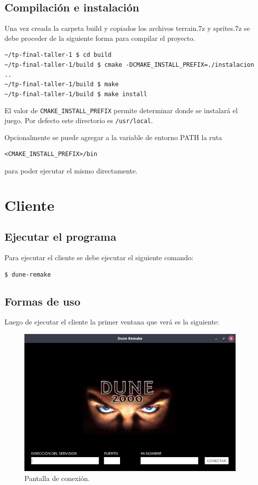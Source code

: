 \documentclass[titlepage,a4paper,12pt]{article}
\begin{document}
\subsection{Compilación e instalación}
Una vez creada la carpeta build y copiados los archivos terrain.7z y sprites.7z se debe proceder de la siguiente forma para compilar el proyecto.

\begin{verbatim}
~/tp-final-taller-1 $ cd build
~/tp-final-taller-1/build $ cmake -DCMAKE_INSTALL_PREFIX=./instalacion ..
~/tp-final-taller-1/build $ make
~/tp-final-taller-1/build $ make install
\end{verbatim}

El valor de \texttt{CMAKE\_INSTALL\_PREFIX} permite determinar donde se instalará el juego. Por defecto este directorio es \texttt{/usr/local}.

Opcionalmente se puede agregar a la variable de entorno PATH la ruta 

\begin{verbatim} 
<CMAKE_INSTALL_PREFIX>/bin 
\end{verbatim}

para poder ejecutar el mismo directamente.

\newpage
\section{Cliente}

\subsection{Ejecutar el programa}

Para ejecutar el cliente se debe ejecutar el siguiente comando:
\begin{verbatim}
$ dune-remake
\end{verbatim}

\subsection{Formas de uso}

Luego de ejecutar el cliente la primer ventana que verá es la siguiente:
\begin{figure}[H]
	\centering
	\includegraphics[width=12cm]{../imagenes/lanzador-cliente-conexion.png}
	\caption{\label{fig:lanzador-cliente-conexion} Pantalla de conexión.}
\end{figure}
\end{document}
